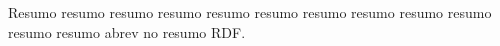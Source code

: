 Resumo resumo resumo resumo resumo resumo resumo resumo resumo resumo resumo resumo abrev no resumo \gls{RDF}.
